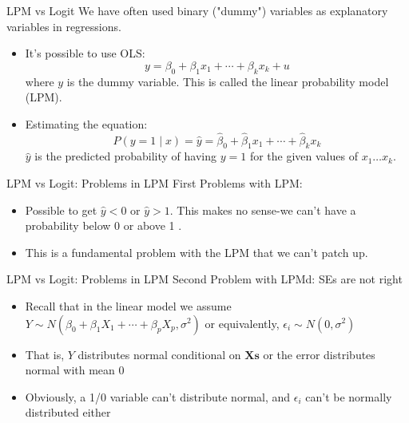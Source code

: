 \begin{frame}{LPM vs Logit}
We have often used binary ("dummy") variables as explanatory variables in regressions.
\begin{itemize}
\item
It's possible to use OLS:
$$
y=\beta_0+\beta_1 x_1+\cdots+\beta_k x_k+u
$$
where $y$ is the dummy variable. This is called the linear probability model (LPM).
\item Estimating the equation:
$$
\hat{P}(y=1 \mid x)=\hat{y}=\hat{\beta}_0+\hat{\beta}_1 x_1+\cdots+\hat{\beta}_k x_k
$$
$\hat{y}$ is the predicted probability of having $y=1$ for the given values of $x_1 \ldots x_k$.
\end{itemize}
\end{frame}


\begin{frame}{LPM vs Logit: Problems in LPM}
First Problems with LPM:
\begin{itemize}
\item Possible to get $\hat{y}<0$ or $\hat{y}>1$. This makes no sense-we can't have a probability below 0 or above 1 .
\item This is a fundamental problem with the LPM that we can't patch up.
\end{itemize}
\end{frame}

\begin{frame}{LPM vs Logit: Problems in LPM}
Second Problem with LPMd:
SEs are not right
\begin{itemize}
\item Recall that in the linear model we assume $Y \sim N\left(\beta_0+\beta_1 X_1+\cdots+\beta_p X_p, \sigma^2\right)$ or equivalently, $\epsilon_i \sim N\left(0, \sigma^2\right)$
\item That is, $Y$ distributes normal conditional on $\mathbf{X} \mathbf{s}$ or the error distributes normal with mean 0
\item Obviously, a 1/0 variable can't distribute normal, and $\epsilon_i$ can't be normally distributed either
\end{itemize}

\end{frame}



